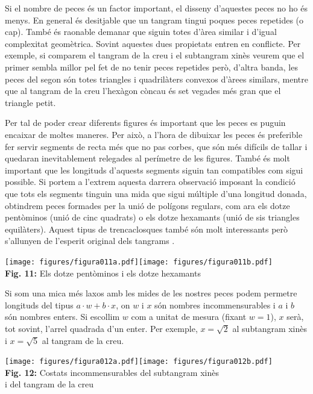 \documentclass[a4paper,11pt]{article}
\begin{document}
\begin{multicols}{2}
            Si el nombre de peces és un factor important, el disseny d'aquestes peces no ho és menys. En general és desitjable que un tangram tingui poques peces repetides (o cap). També és raonable demanar que siguin totes d'àrea similar i d'igual complexitat geomètrica. Sovint aquestes dues propietats entren en conflicte. Per exemple, si comparem el tangram de la creu i el subtangram xinès veurem que el primer sembla millor pel fet de no tenir peces repetides però, d'altra banda, les peces del segon són totes triangles i quadrilàters convexos d'àrees similars, mentre que al tangram de la creu l'hexàgon còncau és set vegades més gran que el triangle petit.

            Per tal de poder crear diferents figures és important que les peces es puguin encaixar de moltes maneres. Per això, a l'hora de dibuixar les peces és preferible fer servir segments de recta més que no pas corbes, que són més difícils de tallar i quedaran inevitablement relegades al perímetre de les figures. També és molt important que les longituds d'aquests segments siguin tan compatibles com sigui possible. Si portem a l'extrem aquesta darrera observació imposant la condició que tots els segments tinguin una mida que sigui múltiple d'una longitud donada, obtindrem peces formades per la unió de polígons regulars, com ara els dotze pentòminos (unió de cinc quadrats) o els dotze hexamants (unió de sis triangles equilàters). Aquest tipus de trencaclosques també són molt interessants però s'allunyen de l'esperit original dels tangrams \cite{coffin2006geometric}.

            \begin{center}
                \texttt{[image: figures/figura011a.pdf]}\qquad\texttt{[image: figures/figura011b.pdf]} \\
                \footnotesize{\textbf{Fig. 11:} Els dotze pentòminos i els dotze hexamants}
            \end{center}

            Si som una mica més laxos amb les mides de les nostres peces podem permetre longituds del tipus $a \cdot w + b \cdot x$, on $w$ i $x$ són nombres incommensurables i $a$ i $b$ són nombres enters. Si escollim $w$ com a unitat de mesura (fixant $w=1$), $x$ serà, tot sovint, l'arrel quadrada d'un enter. Per exemple, $x = \sqrt{2}$ al subtangram xinès i $x = \sqrt{5}$ al tangram de la creu.

            \begin{center}
                \texttt{[image: figures/figura012a.pdf]}\qquad\texttt{[image: figures/figura012b.pdf]} \\
                \footnotesize{\textbf{Fig. 12:} Costats incommensurables del subtangram xinès\\ i del tangram de la creu}
            \end{center}


\end{multicols}
\end{document}
